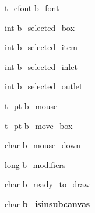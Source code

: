 \begin{DoxyCompactItemize}
\item 
\hyperlink{struct__efont}{t\-\_\-efont} \hyperlink{struct__edspbox_a4071412a20456f5fcafe2a91cdef11c3}{b\-\_\-font}
\item 
int \hyperlink{struct__edspbox_acc1a127070b19ccf6e222d7349c84c96}{b\-\_\-selected\-\_\-box}
\item 
int \hyperlink{struct__edspbox_a1f65b6d093e53fd85bed085ce0c5dd8e}{b\-\_\-selected\-\_\-item}
\item 
int \hyperlink{struct__edspbox_a0cebb4789c213079e0490e86c10c2893}{b\-\_\-selected\-\_\-inlet}
\item 
int \hyperlink{struct__edspbox_acbf0482cb9c6e192e2059775acc1ac86}{b\-\_\-selected\-\_\-outlet}
\item 
\hyperlink{struct__pt}{t\-\_\-pt} \hyperlink{struct__edspbox_a8831d355ec1dbb2dca9a68268a977965}{b\-\_\-mouse}
\item 
\hyperlink{struct__pt}{t\-\_\-pt} \hyperlink{struct__edspbox_a2b028829ae54f8ccede6bb0d5903f7fd}{b\-\_\-move\-\_\-box}
\item 
char \hyperlink{struct__edspbox_a1dc439a4d35e98f78370c81ceadc8ea0}{b\-\_\-mouse\-\_\-down}
\item 
long \hyperlink{struct__edspbox_ad230697acdd2d00abb2dc18dd38089d8}{b\-\_\-modifiers}
\item 
char \hyperlink{struct__edspbox_a234ea03e103bd45f5fa1d27b8e69b5dd}{b\-\_\-ready\-\_\-to\-\_\-draw}
\item 
\hypertarget{struct__edspbox_a4478423a97430b84acbf374f9089f51f}{char {\bfseries b\-\_\-isinsubcanvas}}\label{struct__edspbox_a4478423a97430b84acbf374f9089f51f}


\end{DoxyCompactItemize}
